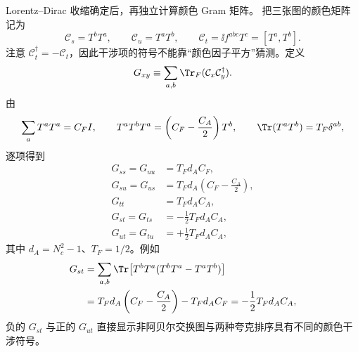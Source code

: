 \begin{derivation}
Lorentz--Dirac 收缩确定后，再独立计算颜色 Gram 矩阵。
把三张图的颜色矩阵记为
\begin{equation*}
 \mathcal C_s=T^bT^a,
 \qquad
 \mathcal C_u=T^aT^b,
 \qquad
 \mathcal C_t=\ii f^{abc}T^c=[T^a,T^b].
\end{equation*}
注意 $\mathcal C_t^\dagger=-\mathcal C_t$，因此干涉项的符号不能靠“颜色因子平方”猜测。定义
\begin{equation*}
 G_{xy}\equiv\sum_{a,b}\Tr_F(\mathcal C_x\mathcal C_y^\dagger).
\end{equation*}
由
\begin{equation*}
 \sum_aT^aT^a=C_FI,
 \qquad
 T^aT^bT^a=\left(C_F-\frac{C_A}{2}\right)T^b,
 \qquad
 \Tr(T^aT^b)=T_F\delta^{ab},
\end{equation*}
逐项得到
\begin{align*}
 G_{ss}=G_{uu}&=T_Fd_AC_F,\\
 G_{su}=G_{us}&=T_Fd_A\left(C_F-\frac{C_A}{2}\right),\\
 G_{tt}&=T_Fd_AC_A,\\
 G_{st}=G_{ts}&=-\frac12T_Fd_AC_A,\\
 G_{ut}=G_{tu}&=+\frac12T_Fd_AC_A,
\end{align*}
其中 $d_A=N_c^2-1$、$T_F=1/2$。例如
\begin{align*}
 G_{st}
 &=\sum_{a,b}\Tr\!\left[T^bT^a(T^bT^a-T^aT^b)\right]\\
 &=T_Fd_A\left(C_F-\frac{C_A}{2}\right)-T_Fd_AC_F
 =-\frac12T_Fd_AC_A,
\end{align*}
负的 $G_{st}$ 与正的 $G_{ut}$ 直接显示非阿贝尔交换图与两种夸克排序具有不同的颜色干涉符号。


\end{derivation}
